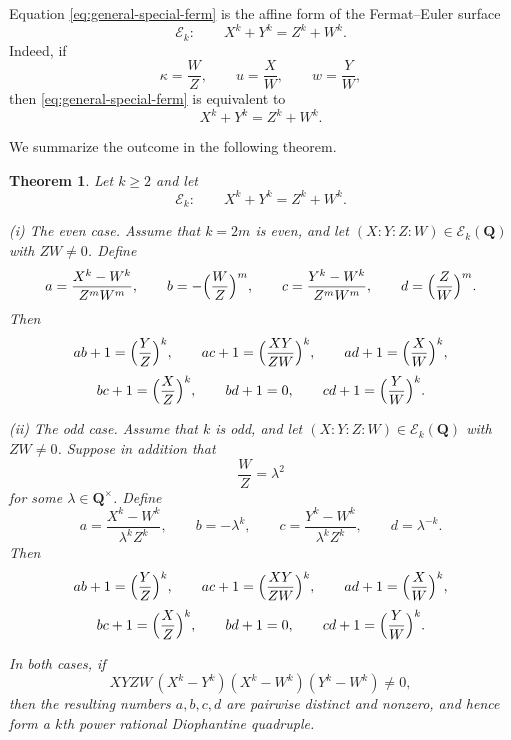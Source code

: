 \documentclass[11pt]{article}
\newtheorem{theorem}{Theorem}[section]
\newcommand{\Q}{\mathbf{Q}}
\begin{document}
Equation \eqref{eq:general-special-ferm} is the affine form of the Fermat--Euler surface
\[
\mathcal E_k:\qquad X^k+Y^k=Z^k+W^k.
\]
Indeed, if
\[
\kappa=\frac{W}{Z},\qquad u=\frac{X}{W},\qquad w=\frac{Y}{W},
\]
then \eqref{eq:general-special-ferm} is equivalent to
\[
X^k+Y^k=Z^k+W^k.
\]

We summarize the outcome in the following theorem.

\begin{theorem}\label{thm:general-euler-to-quadruple}
Let $k\ge 2$ and let
\[
\mathcal E_k:\qquad X^k+Y^k=Z^k+W^k.
\]

\smallskip

\noindent
\textup{(i) The even case.}
Assume that $k=2m$ is even, and let $(X:Y:Z:W)\in \mathcal E_k(\Q)$ with $ZW\neq 0$. Define
\begin{equation}\label{eq:general-euler-map-even}
a=\frac{X^k-W^k}{Z^mW^m},\qquad
b=-\Bigl(\frac{W}{Z}\Bigr)^m,\qquad
c=\frac{Y^k-W^k}{Z^mW^m},\qquad
d=\Bigl(\frac{Z}{W}\Bigr)^m.
\end{equation}
Then
\[
ab+1=\Bigl(\frac{Y}{Z}\Bigr)^k,\qquad
ac+1=\Bigl(\frac{XY}{ZW}\Bigr)^k,\qquad
ad+1=\Bigl(\frac{X}{W}\Bigr)^k,
\]
\[
bc+1=\Bigl(\frac{X}{Z}\Bigr)^k,\qquad
bd+1=0,\qquad
cd+1=\Bigl(\frac{Y}{W}\Bigr)^k.
\]

\smallskip

\noindent
\textup{(ii) The odd case.}
Assume that $k$ is odd, and let $(X:Y:Z:W)\in \mathcal E_k(\Q)$ with $ZW\neq 0$. Suppose in addition that
\[
\frac{W}{Z}=\lambda^2
\]
for some $\lambda\in \Q^\times$. Define
\begin{equation}\label{eq:general-euler-map-odd}
a=\frac{X^k-W^k}{\lambda^k Z^k},\qquad
b=-\lambda^k,\qquad
c=\frac{Y^k-W^k}{\lambda^k Z^k},\qquad
d=\lambda^{-k}.
\end{equation}
Then
\[
ab+1=\Bigl(\frac{Y}{Z}\Bigr)^k,\qquad
ac+1=\Bigl(\frac{XY}{ZW}\Bigr)^k,\qquad
ad+1=\Bigl(\frac{X}{W}\Bigr)^k,
\]
\[
bc+1=\Bigl(\frac{X}{Z}\Bigr)^k,\qquad
bd+1=0,\qquad
cd+1=\Bigl(\frac{Y}{W}\Bigr)^k.
\]

\smallskip

In both cases, if
\begin{equation}\label{eq:general-nondeg}
XYZW\,(X^k-Y^k)(X^k-W^k)(Y^k-W^k)\neq 0,
\end{equation}
then the resulting numbers $a,b,c,d$ are pairwise distinct and nonzero, and hence form a $k$th power rational Diophantine quadruple.
\end{theorem}
\end{document}
